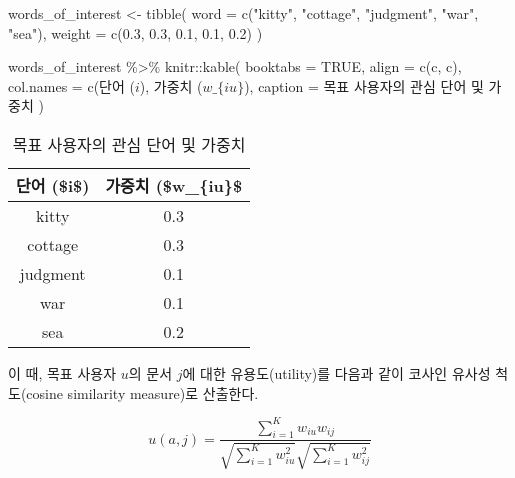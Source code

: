 \documentclass[
]{book}
\newenvironment{Shaded}{\begin{snugshade}}{\end{snugshade}}
\newcommand{\AttributeTok}[1]{\textcolor[rgb]{0.77,0.63,0.00}{#1}}
\newcommand{\ConstantTok}[1]{\textcolor[rgb]{0.00,0.00,0.00}{#1}}
\newcommand{\FloatTok}[1]{\textcolor[rgb]{0.00,0.00,0.81}{#1}}
\newcommand{\FunctionTok}[1]{\textcolor[rgb]{0.00,0.00,0.00}{#1}}
\newcommand{\NormalTok}[1]{#1}
\newcommand{\OtherTok}[1]{\textcolor[rgb]{0.56,0.35,0.01}{#1}}
\newcommand{\SpecialCharTok}[1]{\textcolor[rgb]{0.00,0.00,0.00}{#1}}
\newcommand{\StringTok}[1]{\textcolor[rgb]{0.31,0.60,0.02}{#1}}
\begin{document}
\begin{Shaded}
\begin{Highlighting}[]
\NormalTok{words\_of\_interest }\OtherTok{\textless{}{-}} \FunctionTok{tibble}\NormalTok{(}
  \AttributeTok{word =} \FunctionTok{c}\NormalTok{(}\StringTok{"kitty"}\NormalTok{, }\StringTok{"cottage"}\NormalTok{, }\StringTok{"judgment"}\NormalTok{, }\StringTok{"war"}\NormalTok{, }\StringTok{"sea"}\NormalTok{),}
  \AttributeTok{weight =} \FunctionTok{c}\NormalTok{(}\FloatTok{0.3}\NormalTok{, }\FloatTok{0.3}\NormalTok{, }\FloatTok{0.1}\NormalTok{, }\FloatTok{0.1}\NormalTok{, }\FloatTok{0.2}\NormalTok{)}
\NormalTok{)}

\NormalTok{words\_of\_interest }\SpecialCharTok{\%\textgreater{}\%}
\NormalTok{  knitr}\SpecialCharTok{::}\FunctionTok{kable}\NormalTok{(}
    \AttributeTok{booktabs =} \ConstantTok{TRUE}\NormalTok{,}
    \AttributeTok{align =} \FunctionTok{c}\NormalTok{(}\StringTok{\textquotesingle{}c\textquotesingle{}}\NormalTok{, }\StringTok{\textquotesingle{}c\textquotesingle{}}\NormalTok{),}
    \AttributeTok{col.names =} \FunctionTok{c}\NormalTok{(}\StringTok{\textquotesingle{}단어 ($i$)\textquotesingle{}}\NormalTok{, }\StringTok{\textquotesingle{}가중치 ($w\_\{iu\}$\textquotesingle{}}\NormalTok{),}
    \AttributeTok{caption =} \StringTok{\textquotesingle{}목표 사용자의 관심 단어 및 가중치\textquotesingle{}}
\NormalTok{  )}
\end{Highlighting}
\end{Shaded}

\begin{table}

\caption{\label{tab:word-of-interest}목표 사용자의 관심 단어 및 가중치}
\centering
\begin{tabular}[t]{cc}
\toprule
단어 (\$i\$) & 가중치 (\$w\_\{iu\}\$\\
\midrule
kitty & 0.3\\
cottage & 0.3\\
judgment & 0.1\\
war & 0.1\\
sea & 0.2\\
\bottomrule
\end{tabular}
\end{table}

이 때, 목표 사용자 \(u\)의 문서 \(j\)에 대한 유용도(utility)를 다음과 같이 코사인 유사성 척도(cosine similarity measure)로 산출한다.

\begin{equation*}
u(a, j) = \frac{\sum_{i = 1}^{K} w_{iu} w_{ij}}{\sqrt{\sum_{i = 1}^{K} w_{iu}^2} \sqrt{\sum_{i = 1}^{K} w_{ij}^2}}
\end{equation*}
\end{document}
